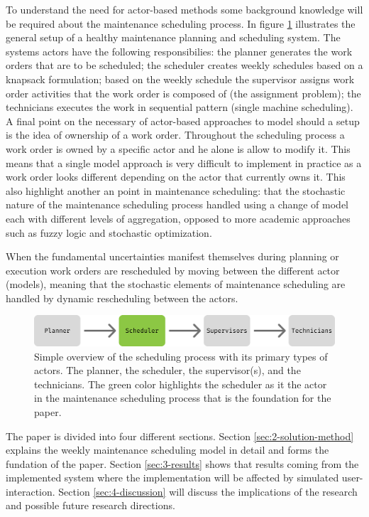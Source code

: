 \documentclass[preprint,12pt,authoryear]{elsarticle}
\begin{document}
To understand the need for actor-based methods some background knowledge will be required about the maintenance scheduling process. In figure \ref{fig:simple-maintenance-process} illustrates the general setup of a healthy maintenance planning and scheduling system. The systems actors have the 
following responsibilies: the planner generates the work orders that are to be scheduled; the scheduler creates weekly schedules based on a knapsack formulation;
based on the weekly schedule the supervisor assigns work order activities that the work order is composed of (the assignment problem); the technicians executes 
the work in sequential pattern (single machine scheduling). A final point on the necessary of actor-based approaches to model should a setup is the 
idea of ownership of a work order. Throughout the scheduling process a work order is owned by a specific actor and he alone is allow to modify it. 
This means that a single model approach is very difficult to implement in practice as a work order looks different depending on the actor that 
currently owns it. This also highlight another an point in maintenance scheduling: that the stochastic nature of the maintenance scheduling process
handled using a change of model each with different levels of aggregation, opposed to more academic approaches such as fuzzy logic and stochastic optimization.

When the fundamental uncertainties manifest themselves during planning or execution work orders are rescheduled by moving between the different actor (models), meaning
that the stochastic elements of maintenance scheduling are handled by dynamic rescheduling between the actors.


\begin{figure}
\includegraphics[width=1.0\textwidth]{figures/Scheduling Process Simple.png}
\caption{Simple overview of the scheduling process with its primary types of actors. The planner, the scheduler, the supervisor(s), and the 
technicians. The green color highlights the scheduler as it the actor in the maintenance scheduling process that is the foundation for the paper.}
\label{fig:simple-maintenance-process}
\end{figure}

The paper is divided into four different sections. Section \ref{sec:2-solution-method} explains the weekly maintenance scheduling model in detail and forms the fundation of the paper. 
Section \ref{sec:3-results} shows that results coming from the implemented system where the implementation will be affected by simulated user-interaction. Section \ref{sec:4-discussion} 
will discuss the implications of the research and possible future research directions.
\end{document}

